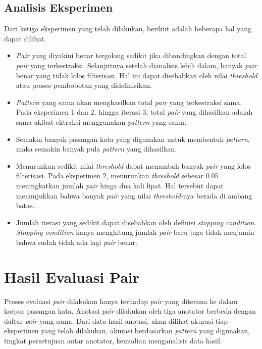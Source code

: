 \subsection{Analisis Eksperimen}
Dari ketiga eksperimen yang telah dilakukan, berikut adalah beberapa hal yang dapat dilihat.
\begin{itemize}
  \item \textit{Pair} yang diyakini benar tergolong sedikit jika dibandingkan dengan total \textit{pair} yang terkestraksi. Selanjutnya setelah dianalisis lebih dalam, banyak \textit{pair} benar yang tidak lolos filterisasi. Hal ini dapat disebabkan oleh nilai \textit{threshold} atau proses pembobotan yang didefinisikan.
  \item \textit{Pattern} yang sama akan menghasilkan total \textit{pair} yang terkestraksi sama. Pada eksperimen 1 dan 2, hingga iterasi 3, total \textit{pair} yang dihasilkan adalah sama akibat ektraksi menggunakan \textit{pattern} yang sama.
  \item Semakin banyak pasangan kata yang digunakan untuk membentuk \textit{pattern}, maka semakin banyak pula \textit{pattern} yang dihasilkan.
  \item Menurunkan sedikit nilai \textit{threshold} dapat menambah banyak \textit{pair} yang lolos filterisasi. Pada eksperimen 2, menurunkan \textit{threshold} sebesar 0.05 meningkatkan jumlah \textit{pair} hinga dua kali lipat. Hal tersebut dapat menunjukkan bahwa banyak \textit{pair} yang nilai \textit{threshold}-nya berada di ambang batas. 
  \item Jumlah iterasi yang sedikit dapat disebabkan oleh definisi \textit{stopping condition}. \textit{Stopping condition} hanya menghitung jumlah \textit{pair} baru juga tidak menjamin bahwa sudah tidak ada lagi \textit{pair} benar. 
\end{itemize}

\section{Hasil Evaluasi Pair}
Proses evaluasi \textit{pair} dilakukan hanya terhadap \textit{pair} yang diterima ke dalam korpus pasangan kata. Anotasi \textit{pair} dilakukan oleh tiga anotator berbeda dengan daftar \textit{pair} yang sama. Dari data hasil anotasi, akan dilihat akurasi tiap eksperimen yang telah dilakukan, akurasi berdasarkan \textit{pattern} yang digunakan, tingkat persetujuan antar anotator, kemudian menganalisis data hasil.


